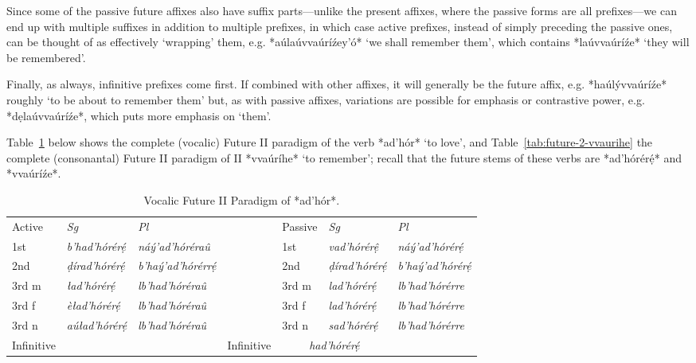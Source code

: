 \documentclass[a4paper, 12pt, oneside, final]{article}
\let \nf \normalfont
\begin{document}
Since some of the passive future affixes also have suffix parts—unlike the present affixes, where the passive forms are
all prefixes—we can end up with multiple suffixes in addition to multiple prefixes, in which case active prefixes, instead
of simply preceding the passive ones, can be thought of as effectively ‘wrapping’ them, e.g. *aúlaúvvaúríźey’ó* ‘we shall
remember them’, which contains *laúvvaúríźe* ‘they will be remembered’.

Finally, as always, infinitive prefixes come first. If combined with other affixes, it will generally be the future affix,
e.g. *haúlývvaúríźe* roughly ‘to be about to remember them’ but, as with passive affixes, variations are possible for emphasis
or contrastive power, e.g. *dẹlaúvvaúríźe*, which puts more emphasis on ‘them’.

Table~\ref{tab:future-2-adhor} below shows the complete (vocalic) Future II paradigm of the verb *ad’hór* ‘to love’, and
Table~\ref{tab:future-2-vvaurihe} the complete (consonantal) Future II paradigm of II *vvaúríhe* ‘to remember’; recall
that the future stems of these verbs are *ad’hórérẹ́* and *vvaúríźe*.

\begin{table}[H]
\centering
\noindent\begin{tabular}{@{}|>{}l|>{\it}l|>{\it}l|>{}l|>{}l|>{\it}l|>{\it}l|}\cline{1-3}\cline{5-7}
Active&\nf Sg&\nf Pl& & Passive&\nf Sg&\nf Pl\\\cline{1-3}\cline{5-7}
1st   &b’had’hórérẹ́  &náý’ad’hóréraû      &&1st    &vad’hórérệ       &náý’ad’hórérẹ́       \\\cline{1-3}\cline{5-7}
2nd   &ḍírad’hórérẹ́  &b’haý’ad’hórérrẹ́    &&2nd    &ḍírad’hórérẹ́     &b’haý’ad’hórérẹ́     \\\cline{1-3}\cline{5-7}
3rd m &ład’hórérẹ́    &lb’had’hóréraû      &&3rd m  &lad’hórérẹ́       &lb’had’hórérre \\\cline{1-3}\cline{5-7}
3rd f &èład’hórérẹ́   &lb’had’hóréraû      &&3rd f  &lad’hórérẹ́       &lb’had’hórérre \\\cline{1-3}\cline{5-7}
3rd n &aúład’hórérẹ́  &lb’had’hóréraû      &&3rd n  &sad’hórérẹ́       &lb’had’hórérre \\\cline{1-3}\cline{5-7}
Infinitive&\multicolumn{2}{c|}{\it dad’hóréré}&&Infinitive&\multicolumn{2}{c|}{\it had’hórérẹ́}\\\cline{1-3}\cline{5-7}
\end{tabular}
\caption{Vocalic Future II Paradigm of *ad’hór*.}\label{tab:future-2-adhor}
\end{table}
\end{document}
